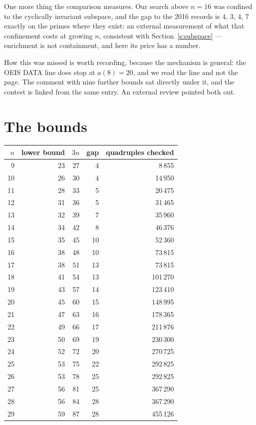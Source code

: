 \documentclass[11pt,a4paper]{article}
\begin{document}
One more thing the comparison measures.  Our search above $n=16$ was confined to the cyclically
invariant subspace, and the gap to the 2016 records is $4$, $3$, $4$, $7$ exactly on the primes where
they exist: an external measurement of what that confinement costs at growing $n$, consistent with
Section~\ref{s:subspace} --- enrichment is not containment, and here its price has a number.

How this was missed is worth recording, because the mechanism is general: the OEIS DATA line
does stop at $a(8)=20$, and we read the line and not the page.  The comment with nine further
bounds sat directly under it, and the contest is linked from the same entry.  An external
review pointed both out.

\section{The bounds}
\begin{center}
\begin{tabular}{rrrrr}
\toprule
$n$ & lower bound & $3n$ & gap & quadruples checked \\
\midrule
9 & 23 & 27 & 4 & 8\,855 \\
10 & 26 & 30 & 4 & 14\,950 \\
11 & 28 & 33 & 5 & 20\,475 \\
12 & 31 & 36 & 5 & 31\,465 \\
13 & 32 & 39 & 7 & 35\,960 \\
14 & 34 & 42 & 8 & 46\,376 \\
15 & 35 & 45 & 10 & 52\,360 \\
16 & 38 & 48 & 10 & 73\,815 \\
17 & 38 & 51 & 13 & 73\,815 \\  %
18 & 41 & 54 & 13 & 101\,270 \\
19 & 43 & 57 & 14 & 123\,410 \\
20 & 45 & 60 & 15 & 148\,995 \\
21 & 47 & 63 & 16 & 178\,365 \\
22 & 49 & 66 & 17 & 211\,876 \\
23 & 50 & 69 & 19 & 230\,300 \\
24 & 52 & 72 & 20 & 270\,725 \\
25 & 53 & 75 & 22 & 292\,825 \\
26 & 53 & 78 & 25 & 292\,825 \\  %
27 & 56 & 81 & 25 & 367\,290 \\
28 & 56 & 84 & 28 & 367\,290 \\  %
29 & 59 & 87 & 28 & 455\,126 \\
\bottomrule
\end{tabular}
\end{center}
\end{document}
